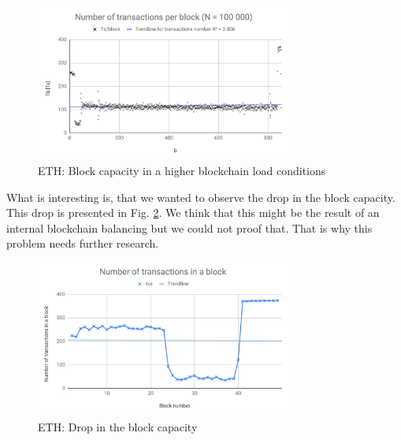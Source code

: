 \begin{figure}[!h]
    \centering
    \includegraphics[width=0.75\textwidth]{img/txmed.png}
   \caption{ETH: Block capacity in a higher blockchain load conditions}
   \label{fig:txbig}
\end{figure}
 
What is interesting is, that we wanted to observe the drop in the block capacity. This drop is presented in Fig. \ref{fig:txsmall}. We think that this might be the result of an internal blockchain balancing but we could not proof that. That is why this problem needs further research.
 
\begin{figure}[!h]
    \centering
    \includegraphics[width=0.75\textwidth]{img/TxNumperBlockSmall.png}
   \caption{ETH: Drop in the block capacity}
   \label{fig:txsmall}
\end{figure}